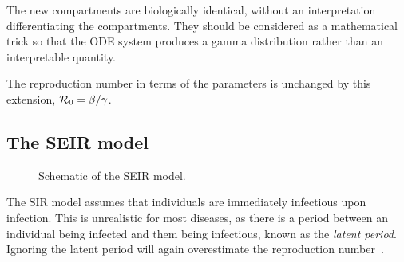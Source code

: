 \documentclass[thesis.tex]{subfiles}
\begin{document}
The new compartments are biologically identical, without an interpretation differentiating the compartments.
They should be considered as a mathematical trick so that the ODE system produces a gamma distribution rather than an interpretable quantity.


The reproduction number in terms of the parameters is unchanged by this extension, \ie $\mathcal{R}_{0} = \beta / \gamma$.

\subsection{The SEIR model} \label{SEIR:sec:SEIR}

\begin{figure}[h]
  \caption[The SEIR model]{Schematic of the SEIR model.}
  \label{SEIR:fig:SEIR}
\end{figure}

The SIR model assumes that individuals are immediately infectious upon infection.
This is unrealistic for most diseases, as there is a period between an individual being infected and them being infectious, known as the \emph{latent period}.
Ignoring the latent period will again overestimate the reproduction number~\autocite{wearingAppropriate}.
\end{document}
